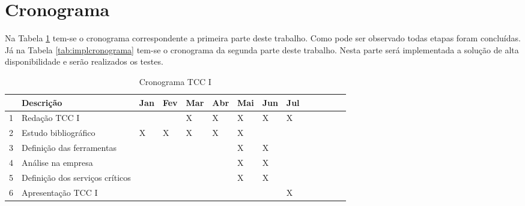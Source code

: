 

\newpage

\section{Cronograma}
\label{section:cronograma}

Na Tabela \ref{tab:propcronograma} tem-se o cronograma correspondente a primeira parte deste trabalho. Como pode ser observado todas etapas foram
concluídas.
Já na Tabela \ref{tab:implcronograma} tem-se o cronograma da segunda parte deste trabalho. Nesta parte será implementada a solução de 
alta disponibilidade e serão realizados os testes.

\begin{table}[h!]\normalsize %
\caption {Cronograma TCC I}
\label{tab:propcronograma}
\begin{center}
\def\arraystretch{1}
\setlength{\tabcolsep}{0.15cm}
\begin{tabular}{|l|l|l|l|l|l|l|l|l|l|l|l|l|l|}\hline
 & \textbf{Descrição} & \textbf{Jan} & \textbf{Fev} & \textbf{Mar} & \textbf{Abr} & \textbf{Mai} & \textbf{Jun} & \textbf{Jul} \\\hline
1 & Redação TCC I & & & X & X & X & X & X \\\hline
2 & Estudo bibliográfico & X & X & X & X & X & & \\\hline
3 & Definição das ferramentas & & & & & X & X & \\\hline
4 & Análise na empresa & & & & & X & X & \\\hline
5 & Definição dos serviços críticos & & & & & X & X & \\\hline
6 & Apresentação TCC I & & & & & & & X \\\hline
\end{tabular}
\end{center}
\end{table}

